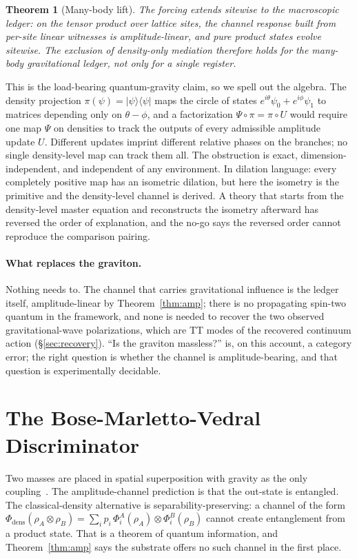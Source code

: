 \documentclass[11pt,letterpaper]{article}
\newtheorem{theorem}{Theorem}[section]
\theoremstyle{definition}
\begin{document}
\begin{theorem}[Many-body lift]\label{thm:manybody}
The forcing extends sitewise to the macroscopic ledger: on the tensor
product over lattice sites, the channel response built from per-site
linear witnesses is amplitude-linear, and pure product states evolve
sitewise.  The exclusion of density-only mediation therefore holds for
the many-body gravitational ledger, not only for a single register.
\end{theorem}

This is the load-bearing quantum-gravity claim, so we spell out the
algebra.  The density projection
$\pi(\psi)=|\psi\rangle\langle\psi|$ maps the circle of states
$e^{i\theta}\psi_0+e^{i\phi}\psi_1$ to matrices depending only on
$\theta-\phi$, and a factorization $\Psi\circ\pi=\pi\circ U$ would
require one map $\Psi$ on densities to track the outputs of every
admissible amplitude update $U$.  Different updates imprint different
relative phases on the branches; no single density-level map can track
them all.  The obstruction is exact, dimension-independent, and
independent of any environment.  In dilation language: every
completely positive map has an isometric dilation, but here the
isometry is the primitive and the density-level channel is derived.  A
theory that starts from the density-level master equation and
reconstructs the isometry afterward has reversed the order of
explanation, and the no-go says the reversed order cannot reproduce
the comparison pairing.

\paragraph{What replaces the graviton.}
Nothing needs to.  The channel that carries gravitational influence is
the ledger itself, amplitude-linear by Theorem~\ref{thm:amp}; there is
no propagating spin-two quantum in the framework, and none is needed
to recover the two observed gravitational-wave polarizations, which
are TT modes of the recovered continuum action
(\S\ref{sec:recovery}).  ``Is the graviton massless?'' is, on this
account, a category error; the right question is whether the channel
is amplitude-bearing, and that question is experimentally decidable.

\section{The Bose-Marletto-Vedral Discriminator}
\label{sec:bmv}

Two masses are placed in spatial superposition with gravity as the
only coupling~\cite{Bose2017,MarlettoVedral2017}.  The
amplitude-channel prediction is that the out-state is entangled.  The
classical-density alternative is separability-preserving: a channel of
the form
$\Phi_{\mathrm{dens}}(\rho_A\otimes\rho_B)
=\sum_i p_i\,\Phi_i^A(\rho_A)\otimes\Phi_i^B(\rho_B)$
cannot create entanglement from a product state.  That is a theorem of
quantum information, and Theorem~\ref{thm:amp} says the substrate
offers no such channel in the first place.
\end{document}
